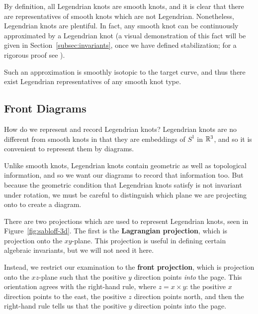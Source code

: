 By definition, all Legendrian knots are smooth knots, and it is clear that there are representatives of smooth knots which are not Legendrian. Nonetheless, Legendrian knots are plentiful. In fact, any smooth knot can be continuously approximated by a Legendrian knot (a visual demonstration of this fact will be given in Section~\ref{subsec:invariants}, once we have defined stabilization; for a rigorous proof see \cite{geiges}).

Such an approximation is smoothly isotopic to the target curve, and thus there exist Legendrian representatives of any smooth knot type.

\subsection{Front Diagrams}

How do we represent and record Legendrian knots? Legendrian knots are no different from smooth knots in that they are embeddings of $S^1$ in $\mathbb{R}^3$, and so it is convenient to represent them by diagrams.

Unlike smooth knots, Legendrian knots contain geometric as well as topological information, and so we want our diagrams to record that information too. But because the geometric condition that Legendrian knots satisfy is not invariant under rotation, we must be careful to distinguish which plane we are projecting onto to create a diagram.

There are two projections which are used to represent Legendrian knots, seen in Figure~\ref{fig:sabloff-3d}. The first is the \textbf{Lagrangian projection}, which is projection onto the $xy$-plane. This projection is useful in defining certain algebraic invariants, but we will not need it here.

Instead, we restrict our examination to the \textbf{front projection}, which is projection onto the $xz$-plane such that the positive $y$ direction points \emph{into} the page. This orientation agrees with the right-hand rule, where $z = x \times y$: the positive $x$ direction points to the east, the positive $z$ direction points north, and then the right-hand rule tells us that the positive $y$ direction points into the page.

